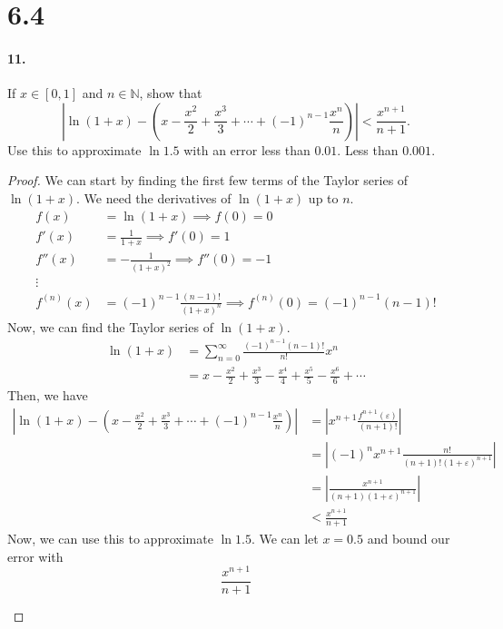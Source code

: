 \documentclass[12pt]{article}
\theoremstyle{remark}
\begin{document}
\section*{6.4}
\paragraph{11.} If $x \in[0,1]$ and $n \in \mathbb{N}$, show that
$$
\left|\ln (1+x)-\left(x-\frac{x^2}{2}+\frac{x^3}{3}+\cdots+(-1)^{n-1} \frac{x^n}{n}\right)\right|<\frac{x^{n+1}}{n+1} .
$$
Use this to approximate $\ln 1.5$ with an error less than $0.01$. Less than $0.001$.
\begin{proof}
    We can start by finding the first few terms of the Taylor series of $\ln (1 + x)$. We need the derivatives of $\ln (1 + x)$ up to $n$.
    \begin{align*}
        f(x) &= \ln (1 + x) \implies f(0) = 0 \\
        f'(x) &= \frac{1}{1 + x} \implies f'(0) = 1 \\
        f''(x) &= -\frac{1}{(1 + x)^2} \implies f''(0) = -1 \\
        \vdots \\
        f^{(n)}(x) &= (-1)^{n - 1} \frac{(n - 1)!}{(1 + x)^n} \implies f^{(n)}(0) = (-1)^{n - 1} (n - 1)!
    \end{align*}
    Now, we can find the Taylor series of $\ln (1 + x)$.
    \begin{align*}
        \ln (1 + x) &= \sum_{n = 0}^{\infty} \frac{(-1)^{n - 1} (n - 1)!}{n!} x^n \\
        &= x - \frac{x^2}{2} + \frac{x^3}{3} - \frac{x^4}{4} + \frac{x^5}{5} - \frac{x^6}{6} + \cdots
    \end{align*}
    Then, we have
    \begin{align*}
        \left|\ln(1 + x) - \left(x - \frac{x^2}{2} + \frac{x^3}{3} + \cdots + (-1)^{n - 1} \frac{x^n}{n}\right)\right| &= \left|x^{n + 1} \frac{f^{n + 1}(\varepsilon)}{(n + 1)!}\right| \\
        &= \left|(-1)^n x^{n + 1} \frac{n!}{(n + 1)!(1 + \varepsilon)^{n + 1}}\right| \\
        &= \left|\frac{x^{n + 1}}{(n + 1)(1 + \varepsilon)^{n + 1}}\right| \\
        &< \frac{x^{n + 1}}{n + 1}
    \end{align*}
    Now, we can use this to approximate $\ln 1.5$. We can let $x = 0.5$ and bound our error with $$\frac{x^{n + 1}}{n + 1}$$
    \begin{itemize}

\end{itemize}
\end{proof}
\end{document}

